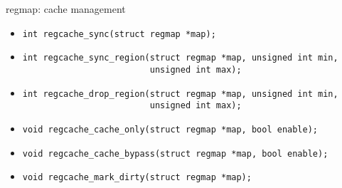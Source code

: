 \begin{frame}[fragile]{regmap: cache management}
  \begin{itemize}
    \item
      \begin{block}{}
        \begin{verbatim}
int regcache_sync(struct regmap *map);
        \end{verbatim}
      \end{block}
    \item 
      \begin{block}{}
        \begin{verbatim}
int regcache_sync_region(struct regmap *map, unsigned int min,
                         unsigned int max);
        \end{verbatim}
      \end{block}
    \item 
      \begin{block}{}
        \begin{verbatim}
int regcache_drop_region(struct regmap *map, unsigned int min,
                         unsigned int max);
        \end{verbatim}
      \end{block}
    \item 
      \begin{block}{}
        \begin{verbatim}
void regcache_cache_only(struct regmap *map, bool enable);
        \end{verbatim}
      \end{block}
    \item 
      \begin{block}{}
        \begin{verbatim}
void regcache_cache_bypass(struct regmap *map, bool enable);
        \end{verbatim}
      \end{block}
    \item 
      \begin{block}{}
        \begin{verbatim}
void regcache_mark_dirty(struct regmap *map);
        \end{verbatim}
      \end{block}
  \end{itemize}
\end{frame}

